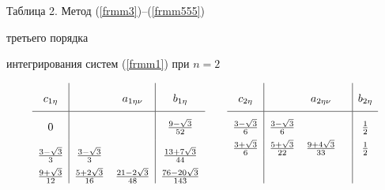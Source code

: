 \begin{center}


Таблица 2. Метод (\ref{frmm3})--(\ref{frmm555})


третьего порядка


интегрирования систем (\ref{frmm1}) при $n=2$


\end{center}





\begin{eqnarray*}


\begin{array}{c|cc|c}


c_{1\eta} & & a_{1\eta\nu} & b_{1\eta}\vrule height6mm width0mm depth3mm\\


\hline


0& & & \frac{ 9-\sqrt{3}}{ 52}\vrule height6mm width0mm depth3mm \\


\frac{3-\sqrt{3}}{ 3} &\frac{ 3-\sqrt{3}}{ 3} & & \frac{ 13+ 7\sqrt{3}}{ 44}


\vrule height6mm width0mm depth3mm\\


\frac{ 9+\sqrt{3}}{ 12}&


\frac{ 5+2\sqrt{3}}{ 16}


& \frac{ 21-2\sqrt{3}}{ 48}


& \frac{ 76- 20\sqrt{3}}{ 143} 


\end{array}


%


\qquad


%


\begin{array}{c|ccc|c}


c_{2\eta} & & a_{2\eta\nu} & & b_{2\eta}\vrule height6mm width0mm depth3mm\\


\hline


\frac{ 3-\sqrt{3}}{ 6} &


\frac{ 3-\sqrt{3}}{ 6}& & & \frac{ 1}{ 2}\vrule height6mm width0mm depth3mm \\


\frac{ 3+\sqrt{3}}{ 6} &


\frac{ 5+\sqrt{3}}{ 22} & 


\frac{ 9+4\sqrt{3}}{ 33} & & \frac{ 1}{ 2} \\


\vrule height6mm width0mm depth3mm &&&&


\end{array}


\end{eqnarray*}





